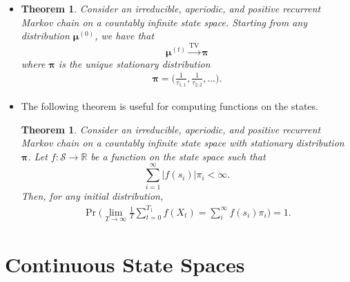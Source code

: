 \documentclass[10pt]{article}
\newtheorem{theorem}[lemma]{Theorem}
\newcommand{\mrm}[1]{\mathrm{#1}}
\newcommand{\ves}[1]{\boldsymbol{#1}}
\newcommand{\Real}{\mathbb{R}}
\begin{document}
\begin{itemize}
  \item \begin{theorem}
    Consider an irreducible, aperiodic, and positive recurrent Markov chain on a countably infinite state space. Starting from any distribution $\ves{\mu}^{(0)}$, we have that $$ \ves{\mu}^{(t)} \xrightarrow{\mrm{TV}} \ves{\pi}$$ where $\ves{\pi}$ is the unique stationary distribution
    \begin{align*}
        \ves{\pi} = \bigg( \frac{1}{\tau_{1,1}}, \frac{1}{\tau_{2,2}}, \dotsc \bigg).
    \end{align*}
  \end{theorem}

  \item The following theorem is useful for computing functions on the states.
  
  \begin{theorem}
    Consider an irreducible, aperiodic, and positive recurrent Markov chain on a countably infinite state space with stationary distribution $\ves{\pi}$. Let $f: \mathcal{S} \rightarrow \Real$ be a function on the state space such that $$\sum_{i=1}^\infty |f(s_i)| \pi_i < \infty.$$ Then, for any initial distribution,
    \begin{align*}
        \Pr \bigg( \lim_{T \rightarrow \infty} \frac{1}{T} \sum_{t=0}^{T_1} f(X_t) = \sum_{i}^\infty f(s_i) \pi_i \bigg) = 1.
    \end{align*}
  \end{theorem}
\end{itemize}

\section{Continuous State Spaces}
\end{document}
